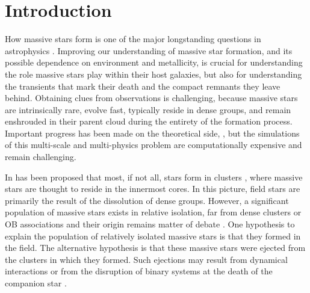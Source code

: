 \documentclass[apjl,twocolumn]{emulateapj}
\begin{document}
\maketitle{}

\section{Introduction}
\label{sec:intro}

How massive stars form is one of the major longstanding questions in astrophysics
\citep[e.g.,][]{zinnecker:07}. Improving our understanding of massive star formation, and its
possible dependence on environment and metallicity, is crucial for understanding the role massive stars play within their host galaxies, but also for understanding the transients that mark their death and the compact remnants they leave behind.
%
Obtaining clues from observations is challenging, because massive stars are intrinsically rare, 
evolve fast, typically reside in dense groups, and remain enshrouded in
their parent cloud during the entirety of the formation
process. Important progress has been made on the theoretical side,
\citep[e.g.][]{bate:09,kuiper:15,rosen:16}, but the simulations of this multi-scale and multi-physics problem are computationally expensive and remain challenging.  

In has been proposed that most, if not all, stars form in clusters \citep{lada:03}, where massive stars are thought to reside in the innermost cores. In this picture, field stars are primarily the result of the dissolution of dense groups.  However, a significant population of massive stars exists in relative isolation, far from dense clusters or OB associations and their origin remains matter of debate \citep{gvaramadze:12, lamb:16,ward:18}.   One hypothesis to explain the population of relatively isolated massive stars is that they formed in the field. The alternative hypothesis is that these massive stars were ejected from the clusters in which they formed.  Such ejections may result from dynamical interactions \citep[e.g.,][]{poveda:67} or from the disruption of binary systems at the death of the companion  star \citep[e.g.,][]{blaauw:61, renzo:18}. 
 
\end{document}
